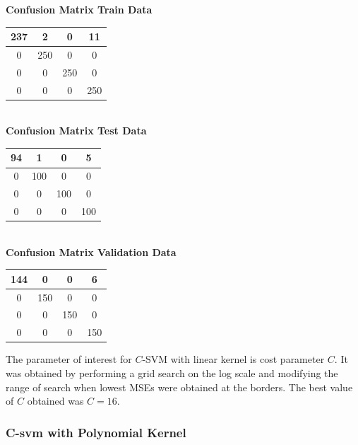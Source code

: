 \documentclass{article}
\begin{document}
\begin{flushleft}
\textbf{Confusion Matrix Train Data\\[5pt]}
\begin{tabular}{|c|c|c|c|}
\hline
237 & 2 & 0 & 11 \\
\hline
0 & 250 & 0 & 0 \\
\hline
0 & 0 & 250 & 0 \\
\hline
0 & 0 & 0 & 250 \\
\hline
\end{tabular}
\textbf{\\[10pt] Confusion Matrix Test Data \\[5pt]}
\begin{tabular}{|c|c|c|c|}
\hline
94 & 1 & 0 & 5 \\
\hline
0 & 100 & 0 & 0 \\
\hline
0 & 0 & 100 & 0 \\
\hline
0 & 0 & 0 & 100 \\
\hline
\end{tabular}
\textbf{\\[10pt] Confusion Matrix Validation Data \\[5pt]}
\begin{tabular}{|c|c|c|c|}
\hline
144 & 0 & 0 & 6 \\
\hline
0 & 150 & 0 & 0 \\
\hline
0 & 0 & 150 & 0 \\
\hline
0 & 0 & 0 & 150 \\
\hline
\end{tabular}
\end{flushleft}


The parameter of interest for $C$-SVM with linear kernel is cost parameter $C$. It was obtained by performing a grid search on the log scale and modifying the range of search when lowest MSEs were obtained at the borders.
The best value of $C$ obtained was $C=16$. 

\newpage
\subsubsection{C-svm with Polynomial Kernel}
\end{document}
